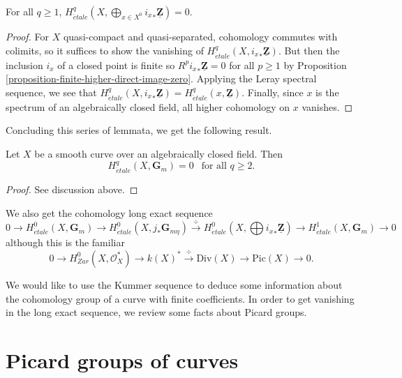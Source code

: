 \begin{lemma}
\label{lemma-cohomology-istar-Z}
For all $q \geq 1$, $H_{\acute{e}tale}^q(X, \bigoplus_{x \in X^0} {i_x}_*
\underline{\mathbf{Z}}) = 0$.
\end{lemma}

\begin{proof}
For $X$ quasi-compact and quasi-separated, cohomology commutes with colimits,
so it suffices to show the vanishing of $H_{\acute{e}tale}^q(X, {i_x}_*
\underline{\mathbf{Z}})$. But then the inclusion $i_x$ of a closed point is
finite so $R^p {i_x}_* \underline{\mathbf{Z}} = 0$ for all $p \geq 1$ by
Proposition \ref{proposition-finite-higher-direct-image-zero}.
Applying the Leray spectral sequence, we see that
$H_{\acute{e}tale}^q(X, {i_x}_* \underline{\mathbf{Z}}) =
H_{\acute{e}tale}^q(x, \underline{\mathbf{Z}})$.
Finally, since $x$ is the spectrum of an
algebraically closed field, all higher cohomology on $x$ vanishes.
\end{proof}

\noindent
Concluding this series of lemmata, we get the following result.

\begin{theorem}
\label{theorem-vanishing-cohomology-Gm-curve}
Let $X$ be a smooth curve over an algebraically closed field. Then
$$
H_{\acute{e}tale}^q(X, \mathbf{G}_m) = 0 \ \ \text{ for all } q \geq 2.
$$
\end{theorem}

\begin{proof}
See discussion above.
\end{proof}

\noindent
We also get the cohomology long exact sequence
$$
0 \to
H_{\acute{e}tale}^0(X, \mathbf{G}_m) \to
H_{\acute{e}tale}^0(X, j_*\mathbf{G}_{m\eta}) \xrightarrow{\div}
H_{\acute{e}tale}^0(X, \bigoplus {i_x}_*\underline{\mathbf{Z}}) \to
H_{\acute{e}tale}^1(X, \mathbf{G}_m) \to 0
$$
although this is the familiar
$$
0 \to H_{Zar}^0(X, \mathcal{O}_X^*) \to k(X)^* \xrightarrow{\div} \text{Div}(X)
\to \text{Pic}(X) \to 0.
$$

\medskip\noindent
We would like to use the Kummer sequence to deduce some information about the
cohomology group of a curve with finite coefficients. In order to get vanishing
in the long exact sequence, we review some facts about Picard groups.





\section{Picard groups of curves}
\label{section-pic-curves}

